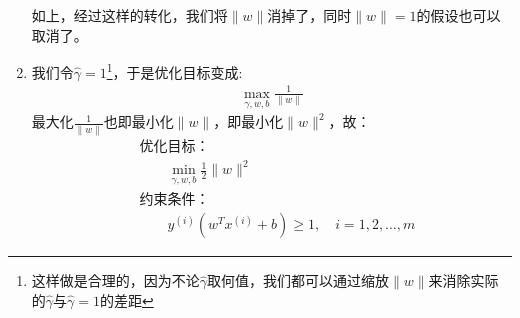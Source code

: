 \begin{enumerate}
	如上，经过这样的转化，我们将$\|w\|$消掉了，同时$\|w\| = 1$的假设也可以取消了。

	\item 我们令$\hat{\gamma}=1$\footnote{这样做是合理的，因为不论$\hat{\gamma}$取何值，我们都可以通过缩放$\|w\|$来消除实际的$\hat{\gamma}$与$\hat{\gamma}=1$的差距}，于是优化目标变成:
	\begin{align}
		\max_{\gamma, w, b} \frac{1}{\|w\|}
	\end{align}
	最大化$\frac{1}{\|w\|}$也即最小化$\|w\|$，即最小化$\|w\|^2$，故：
	\begin{align}
		&\text{优化目标：} \\
		& \qquad \min_{\gamma, w, b} \frac{1}{2}\|w\|^2 \\
		&\text{约束条件：} \\
		& \qquad y^{(i)}(w^Tx^{(i)}+b) \geq 1, \quad i=1, 2, \dots, m
	\end{align}
\end{enumerate}





































